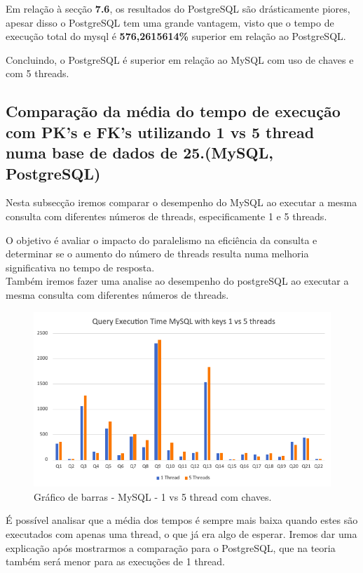 \documentclass{article}
\begin{document}
\quad Em relação à secção \textbf{7.6}, os resultados do PostgreSQL são drásticamente piores, apesar disso o PostgreSQL tem uma grande vantagem, visto que o tempo de execução total do mysql é \textbf{576,2615614\%} superior em relação ao PostgreSQL.

Concluindo, o PostgreSQL é superior em relação ao MySQL com uso de chaves e com 5 threads.
\clearpage
  \subsection{Comparação da média do tempo de execução com PK's e FK's
  utilizando 1 vs 5 thread numa base de dados de 25.(MySQL, PostgreSQL)}
  
  \quad Nesta subsecção iremos comparar o desempenho do MySQL ao executar a mesma consulta com diferentes números de threads, especificamente 1 e 5 threads. 
  
  O objetivo é avaliar o impacto do paralelismo na eficiência da consulta e determinar se o aumento do número de threads resulta numa melhoria significativa no tempo de resposta.\\

  Também iremos fazer uma analise ao desempenho do postgreSQL ao executar a mesma consulta com diferentes números de threads.

  \begin{figure}[H]
    \centering
    \includegraphics[width=\textwidth]{Graphs/mysql_withkeys_1vs5threads.png}
    \caption{Gráfico de barras - MySQL - 1 vs 5 thread com chaves.} 
    \label{fig:PKCreation2}

  \end{figure}

  \quad É possível analisar que a média dos tempos é sempre mais baixa quando estes são executados com apenas uma thread, o que já era algo de esperar. Iremos dar uma explicação após mostrarmos a comparação para o PostgreSQL, que na teoria também será menor para as execuções de 1 thread.
    
\end{document}
